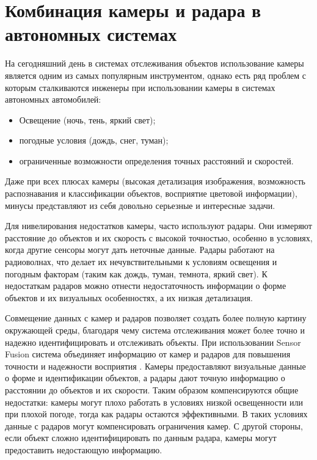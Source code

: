 \chapter{Комбинация камеры и радара в автономных системах}

На сегодняшний день в системах отслеживания объектов использование камеры является 
одним из самых популярным инструментом, однако есть ряд проблем с которым сталкиваются
инженеры при использовании камеры в системах автономных автомобилей:

\begin{itemize}

	\item Освещение (ночь, тень, яркий свет);
	
	\item погодные условия (дождь, снег, туман);
	
	\item ограниченные возможности определения точных расстояний и скоростей.

\end{itemize}

Даже при всех плюсах камеры (высокая детализация изображения, возможность распознавания
и классификации объектов, восприятие цветовой информации), минусы представляют из себя
довольно серьезные и интересные задачи.

Для нивелирования недостатков камеры, часто используют радары. Они измеряют расстояние
до объектов и их скорость с высокой точностью, особенно в условиях, когда другие
сенсоры могут дать неточные данные. Радары работают на радиоволнах, что делает их
нечувствительными к условиям освещения и погодным факторам (таким как дождь, туман,
темнота, яркий свет). К недостаткам радаров можно отнести недостаточность информации 
о форме объектов и их визуальных особенностях, а их низкая детализация.

Совмещение данных с камер и радаров позволяет создать более полную картину окружающей
среды, благодаря чему система отслеживания может более точно и надежно идентифицировать
и отслеживать объекты. При использовании Sensor Fusion система объединяет информацию от
камер и радаров для повышения точности и надежности восприятия \cite{Wang2020}. Камеры предоставляют
визуальные данные о форме и идентификации объектов, а радары дают точную информацию о расстоянии до объектов и их скорости. Таким образом компенсируются общие недостатки: 
камеры могут плохо работать в условиях низкой освещенности или при плохой погоде, тогда
как радары остаются эффективными. В таких условиях данные с радаров могут компенсировать
ограничения камер. С другой стороны, если объект сложно идентифицировать по данным 
радара, камеры могут предоставить недостающую информацию.

